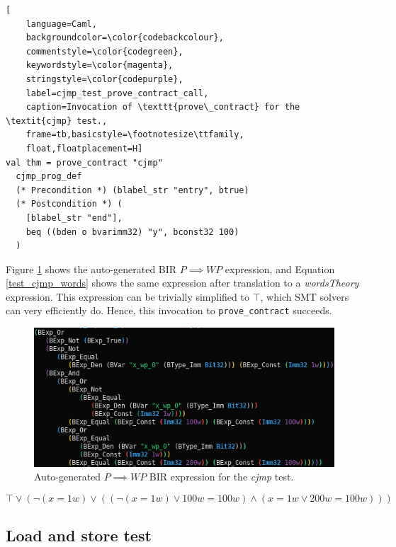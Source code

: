 \documentclass{kththesis}
\newcommand{\WP}{\ensuremath{\mathit{WP}}}
\begin{document}
{\begin{lstlisting}[
    language=Caml,
    backgroundcolor=\color{codebackcolour},
    commentstyle=\color{codegreen},
    keywordstyle=\color{magenta},
    stringstyle=\color{codepurple},
    label=cjmp_test_prove_contract_call,
    caption=Invocation of \texttt{prove\_contract} for the \textit{cjmp} test.,
    frame=tb,basicstyle=\footnotesize\ttfamily,
    float,floatplacement=H]
val thm = prove_contract "cjmp"
  cjmp_prog_def
  (* Precondition *) (blabel_str "entry", btrue)
  (* Postcondition *) (
    [blabel_str "end"],
    beq ((bden o bvarimm32) "y", bconst32 100)
  )
\end{lstlisting}

Figure \ref{test_cjmp_bir} shows the auto-generated BIR $P \implies \WP$ expression, and Equation \ref{test_cjmp_words} shows the same expression after translation to a \textit{wordsTheory} expression. This expression can be trivially simplified to $\top$, which SMT solvers can very efficiently do. Hence, this invocation to \texttt{prove\_contract} succeeds.

\begin{figure}[!h]
	\includegraphics[width=\textwidth]{figures/test_cjmp_bir.png}
	\centering
	\caption{Auto-generated $P \implies \WP$ BIR expression for the \textit{cjmp} test.}
	\label{test_cjmp_bir}
\end{figure}

\begin{equation}
    \top \lor
    (\neg(x = 1w) \lor ((\neg(x = 1w) \lor 100w = 100w) \land (x = 1w \lor 200w = 100w)))
    \label{test_cjmp_words}
\end{equation}

\subsection{Load and store test} \label{addreq_test}

}
\end{document}
